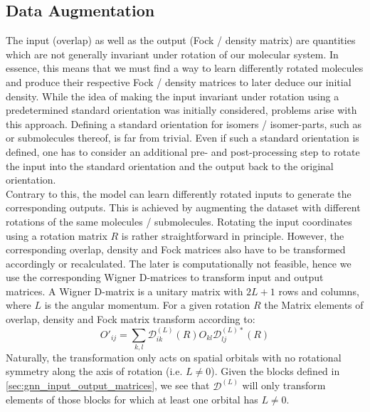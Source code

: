 \subsection{Data Augmentation}
\label{subsec:gnn_data_augmentation}
The input (overlap) as well as the output (Fock / density matrix) are quantities which are not generally invariant under rotation of our molecular system. In essence, this means that we must find a way to learn differently rotated molecules and produce their respective Fock / density matrices to later deduce our initial density. While the idea of making the input invariant under rotation using a predetermined standard orientation was initially considered, problems arise with this approach. Defining a standard orientation for isomers / isomer-parts, such as  or submolecules thereof, is far from trivial. Even if such a standard orientation is defined, one has to consider an additional pre- and post-processing step to rotate the input into the standard orientation and the output back to the original orientation. \\
Contrary to this, the model can learn differently rotated inputs to generate the corresponding outputs. This is achieved by augmenting the dataset with different rotations of the same molecules / submolecules. Rotating the input coordinates using a rotation matrix $R$ is rather straightforward in principle. However, the corresponding overlap, density and Fock matrices also have to be transformed accordingly or recalculated. The later is computationally not feasible, hence we use the corresponding Wigner D-matrices to transform input and output matrices. 
A Wigner D-matrix is a unitary matrix with $2L + 1$ rows and columns, where $L$ is the angular momentum. For a given rotation $R$ the Matrix elements of overlap, density and Fock matrix transform according to:
\begin{equation}
    \label{eq:wigner_d_transform}
    O'_{ij} = \sum_{k,l} \mathcal{D}^{(L)}_{ik}(R) O_{kl} \mathcal{D}^{(L)*}_{lj}(R)
\end{equation}
Naturally, the transformation only acts on spatial orbitals with no rotational symmetry along the axis of rotation (i.e. $L \neq 0$). Given the blocks defined in \autoref{sec:gnn_input_output_matrices}, we see that $\mathcal{D}^{(L)}$ will only transform elements of those blocks for which at least one orbital has $L \neq 0$.


